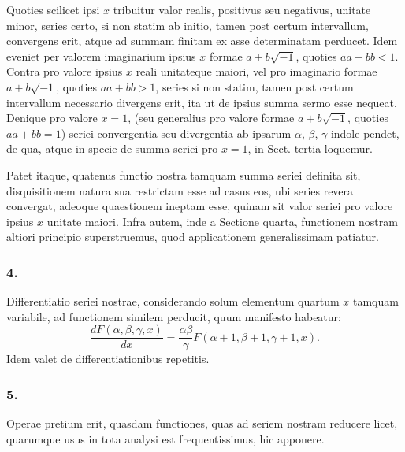 \documentclass[12pt,a4paper]{article}
\newcommand{\1}{\ensuremath{\mathrlap{\,|\,}}} %
\begin{document}
Quoties scilicet ipsi $x$ tribuitur valor realis, positivus seu negativus, unitate minor, series certo, si non statim ab initio, tamen post certum intervallum, convergens erit, atque ad summam finitam ex asse determinatam perducet. Idem eveniet per valorem imaginarium ipsius $x$ formae $a + b\sqrt{-1}$, quoties $aa + bb < 1$. Contra pro valore ipsius $x$ reali unitateque maiori, vel pro imaginario formae $a + b\sqrt{-1}$, quoties $aa + bb > 1$, series si non statim, tamen post certum intervallum necessario divergens erit, ita ut de ipsius summa sermo esse nequeat. Denique pro valore $x = 1$, (seu generalius pro valore formae $a + b\sqrt{-1}$, quoties $aa + bb = 1$) seriei convergentia seu divergentia ab ipsarum $\alpha$, $\beta$, $\gamma$ indole pendet, de qua, atque in specie de summa seriei pro $x = 1$, in Sect. tertia loquemur.

Patet itaque, quatenus functio nostra tamquam summa seriei definita sit, disquisitionem natura sua restrictam esse ad casus eos, ubi series revera convergat, adeoque quaestionem ineptam esse, quinam sit valor seriei pro valore ipsius $x$ unitate maiori. Infra autem, inde a Sectione quarta, functionem nostram altiori principio superstruemus, quod applicationem generalissimam patiatur.

\subsubsection*{4.}
Differentiatio seriei nostrae, considerando solum elementum quartum $x$ tamquam variabile, ad functionem similem perducit, quum manifesto habeatur:
\[\frac{dF(\alpha, \beta, \gamma, x)}{dx} = \frac{\alpha\beta}{\gamma}F(\alpha+1, \beta+1, \gamma+1, x).\]
Idem valet de differentiationibus repetitis.

\subsubsection*{5.}
Operae pretium erit, quasdam functiones, quas ad seriem nostram reducere licet, quarumque usus in tota analysi est frequentissimus, hic apponere.
\end{document}
